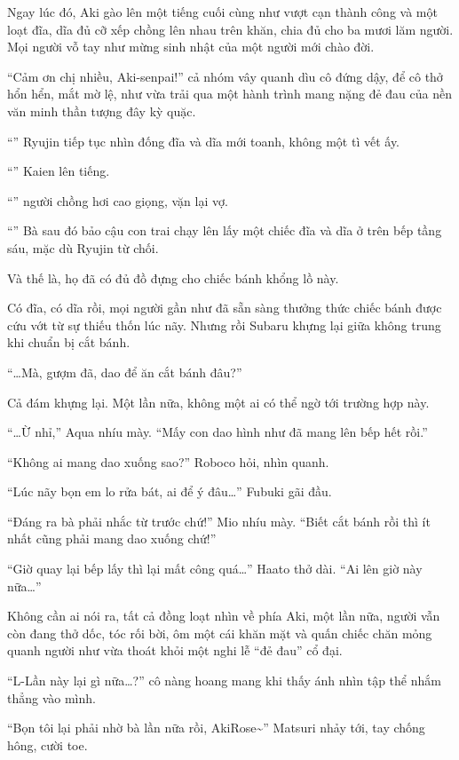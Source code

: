 \documentclass[../main.tex]{subfiles}
\begin{document}
Ngay lúc đó, Aki gào lên một tiếng cuối cùng như vượt cạn thành công và một loạt đĩa, dĩa đủ cỡ xếp chồng lên nhau trên khăn, chia đủ cho ba mươi lăm người. Mọi người vỗ tay như mừng sinh nhật của một người mới chào đời.

``Cảm ơn chị nhiều, Aki-senpai!'' cả nhóm vây quanh dìu cô đứng dậy, để cô thở hổn hển, mắt mờ lệ, như vừa trải qua một hành trình mang nặng đẻ đau của nền văn minh thần tượng đây kỳ quặc.

``'' Ryujin tiếp tục nhìn đống đĩa và dĩa mới toanh, không một tì vết ấy.

``'' Kaien lên tiếng.

``'' người chồng hơi cao giọng, vặn lại vợ.

``'' Bà sau đó bảo cậu con trai chạy lên lấy một chiếc đĩa và dĩa ở trên bếp tầng sáu, mặc dù Ryujin từ chối.

Và thế là, họ đã có đủ đồ đựng cho chiếc bánh khổng lồ này.

Có đĩa, có dĩa rồi, mọi người gần như đã sẵn sàng thưởng thức chiếc bánh được cứu vớt từ sự thiếu thốn lúc nãy. Nhưng rồi Subaru khựng lại giữa không trung khi chuẩn bị cắt bánh.

``\dots Mà, gượm đã, dao để ăn cắt bánh đâu?''

Cả đám khựng lại. Một lần nữa, không một ai có thể ngờ tới trường hợp này.

``\dots Ừ nhỉ,'' Aqua nhíu mày. ``Mấy con dao hình như đã mang lên bếp hết rồi.''

``Không ai mang dao xuống sao?'' Roboco hỏi, nhìn quanh.

``Lúc nãy bọn em lo rửa bát, ai để ý đâu\dots'' Fubuki gãi đầu.

``Đáng ra bà phải nhắc từ trước chứ!'' Mio nhíu mày. ``Biết cắt bánh rồi thì ít nhất cũng phải mang dao xuống chứ!''

``Giờ quay lại bếp lấy thì lại mất công quá\dots'' Haato thở dài. ``Ai lên giờ này nữa\dots''

Không cần ai nói ra, tất cả đồng loạt nhìn về phía Aki, một lần nữa, người vẫn còn đang thở dốc, tóc rối bời, ôm một cái khăn mặt và quấn chiếc chăn mỏng quanh người như vừa thoát khỏi một nghi lễ ``đẻ đau'' cổ đại.

``L-Lần này lại gì nữa\dots?'' cô nàng hoang mang khi thấy ánh nhìn tập thể nhắm thẳng vào mình.

``Bọn tôi lại phải nhờ bà lần nữa rồi, AkiRose\~{}'' Matsuri nhảy tới, tay chống hông, cười toe.
\end{document}

